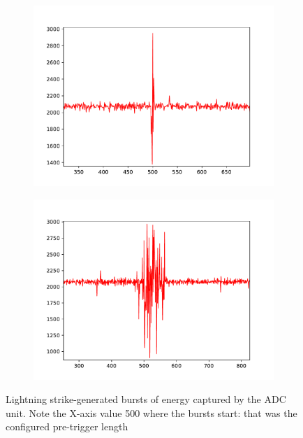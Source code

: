 \begin{figure}[h]
\begin{subfigure}{.5\textwidth}
	\includegraphics[width=\textwidth]{img/strike3}
	\end{subfigure}%
	\begin{subfigure}{.5\textwidth}
	\includegraphics[width=\textwidth]{img/strike4}
	\end{subfigure}
	\caption{Lightning strike-generated bursts of energy captured by the ADC unit. Note the X-axis value 500 where the bursts start: that was the configured pre-trigger length}
	\label{fig:strikes}
\end{figure}










